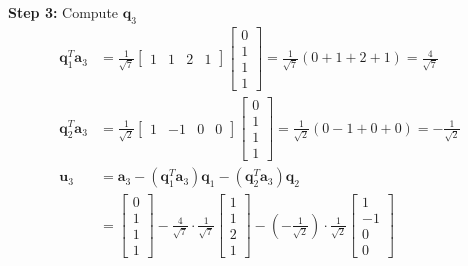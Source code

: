\textbf{Step 3:} Compute $\mathbf{q}_3$
\begin{align*}
    \mathbf{q}_1^T \mathbf{a}_3 & = \frac{1}{\sqrt{7}} \begin{bmatrix} 1 & 1 & 2 & 1 \end{bmatrix} \begin{bmatrix} 0 \\ 1 \\ 1 \\ 1 \end{bmatrix} = \frac{1}{\sqrt{7}}(0 + 1 + 2 + 1) = \frac{4}{\sqrt{7}}                                                                                  \\
    \mathbf{q}_2^T \mathbf{a}_3 & = \frac{1}{\sqrt{2}} \begin{bmatrix} 1 & -1 & 0 & 0 \end{bmatrix} \begin{bmatrix} 0 \\ 1 \\ 1 \\ 1 \end{bmatrix} = \frac{1}{\sqrt{2}}(0 - 1 + 0 + 0) = -\frac{1}{\sqrt{2}}                                                                                \\
    \mathbf{u}_3                & = \mathbf{a}_3 - (\mathbf{q}_1^T \mathbf{a}_3)\mathbf{q}_1 - (\mathbf{q}_2^T \mathbf{a}_3)\mathbf{q}_2                                                                                                                                                    \\
                                & = \begin{bmatrix} 0 \\ 1 \\ 1 \\ 1 \end{bmatrix} - \frac{4}{\sqrt{7}} \cdot \frac{1}{\sqrt{7}} \begin{bmatrix} 1 \\ 1 \\ 2 \\ 1 \end{bmatrix} - \left(-\frac{1}{\sqrt{2}}\right) \cdot \frac{1}{\sqrt{2}} \begin{bmatrix} 1 \\ -1 \\ 0 \\ 0 \end{bmatrix} \\

\end{align*}
